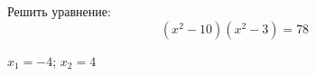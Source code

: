 \begin{ex}
	Решить уравнение:
	$$ (x^2-10)(x^2-3)=78 $$
	\begin{answer}
		$x_1=-4$; $x_2=4$
	\end{answer}
\end{ex}